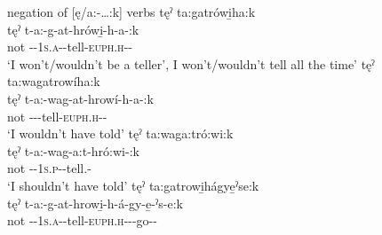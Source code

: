 \ea\label{ex:no-mood-negation2} negation of [ę/a:-…:k]  verbs
\ea tęˀ ta:gatrówi̱ha:k\\
\gll tęˀ t-a:-g-at-hrówi̱-h-a-:k\\ 
not {\contrastive}-{\indefinite}-\textsc{1s.a}-{\semireflexive}-tell-\textsc{euph.h}-{\joinerA}-{\modalizer}\\
\glt  ‘I won’t/wouldn’t be a teller’, I won’t/wouldn’t tell all the time’
\ex tęˀ ta:wagatrowíha:k  \\
\gll tęˀ t-a:-wag-at-hrowí-h-a-:k\\
not {\negative}-{\indefinite}-\exsc{\semireflexive}-tell-\textsc{euph.h}-{\joinerA}-{\modalizer}\\
\glt ‘I wouldn’t have told’
\ex tęˀ ta:waga:tró:wi:k  \\
\gll tęˀ t-a:-wag-a:t-hró:wi-:k\\
 not {\contrastive}-{\indefinite}-\textsc{1s.p}-{\semireflexive}-tell.{\stative}-{\modalizer}\\
\glt ‘I shouldn’t have told’
\ex tęˀ ta:gatrowi̱hágye̱ˀse:k  \\
\gll tęˀ t-a:-g-at-hrowi̱-h-á-gy-e̱-ˀs-e:k\\
not {\negative}-{\indefinite}-\textsc{1s.a}-{\semireflexive}-tell-\textsc{euph.h}-{\joinerA}-{\progressive}-go-{\habitual}-{\modalizer}\\
